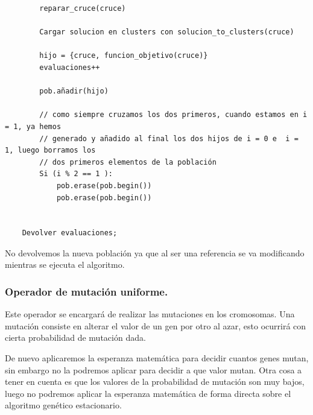 \documentclass[12pt, spanish]{article}
\begin{document}
\begin{lstlisting}
		reparar_cruce(cruce)
		
		Cargar solucion en clusters con solucion_to_clusters(cruce)
		
		hijo = {cruce, funcion_objetivo(cruce)}
		evaluaciones++
		
		pob.añadir(hijo)
		
		// como siempre cruzamos los dos primeros, cuando estamos en i = 1, ya hemos
		// generado y añadido al final los dos hijos de i = 0 e  i = 1, luego borramos los
		// dos primeros elementos de la población
		Si (i % 2 == 1 ):
			pob.erase(pob.begin())
			pob.erase(pob.begin())
					

	Devolver evaluaciones;

\end{lstlisting}

No devolvemos la nueva población ya que al ser una referencia se va modificando mientras se ejecuta el algoritmo.


\subsubsection{Operador de mutación uniforme.}

Este operador se encargará de realizar las mutaciones en los cromosomas. Una mutación consiste en alterar el valor de un gen por otro al azar, esto ocurrirá con cierta probabilidad de mutación dada.

De nuevo aplicaremos la esperanza matemática para decidir cuantos genes mutan, sin embargo no la podremos aplicar para decidir a que valor mutan. Otra cosa a tener en cuenta es que los valores de la probabilidad de mutación son muy bajos, luego no podremos aplicar la esperanza matemática de forma directa sobre el algoritmo genético estacionario.
\end{document}

